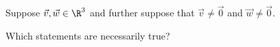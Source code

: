 \documentclass{ximera}
\author{Jim Talamo \and Jim Fowler}
\begin{document}
\begin{exercise}
  Suppose $\vec{v}, \vec{w} \in \R^3$ and further suppose that $\vec{v} \neq \vec{0}$ and $\vec{w} \neq \vec{0}$.

  Which statements are necessarily true?
  \begin{selectAll}
  \end{selectAll}
\end{exercise}
\end{document}
